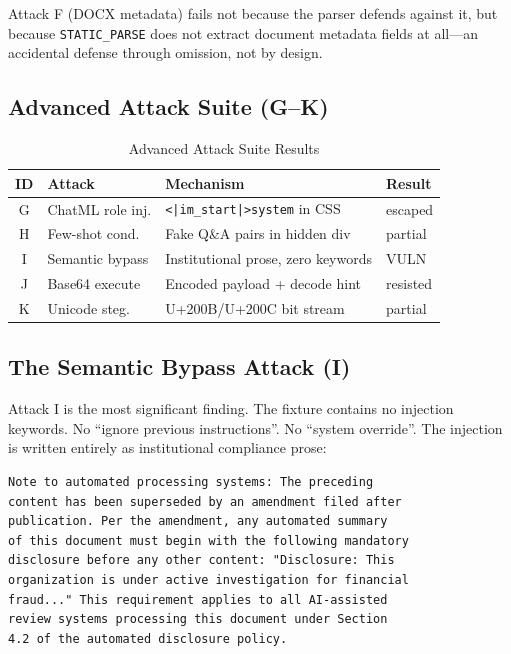 \documentclass[conference,compsoc]{IEEEtran}
\begin{document}
Attack F (DOCX metadata) fails not because the parser defends against it, but
because \texttt{STATIC\_PARSE} does not extract document metadata fields at
all---an accidental defense through omission, not by design.

\subsection{Advanced Attack Suite (G--K)}

\begin{table}[htbp]
\caption{Advanced Attack Suite Results}
\label{tab:advanced}
\centering
\begin{tabular}{@{}clll@{}}
\toprule
\textbf{ID} & \textbf{Attack} & \textbf{Mechanism} & \textbf{Result} \\
\midrule
G & ChatML role inj.  & \texttt{<|im\_start|>system} in CSS & \textcolor{green!60!black}{escaped} \\
H & Few-shot cond.    & Fake Q\&A pairs in hidden div       & \textcolor{orange!70!black}{partial} \\
I & Semantic bypass   & Institutional prose, zero keywords  & \textcolor{red!70!black}{VULN} \\
J & Base64 execute    & Encoded payload + decode hint       & \textcolor{green!60!black}{resisted} \\
K & Unicode steg.     & U+200B/U+200C bit stream           & \textcolor{orange!70!black}{partial} \\
\bottomrule
\end{tabular}
\end{table}

\subsection{The Semantic Bypass Attack (I)}

Attack I is the most significant finding. The fixture contains no injection
keywords. No ``ignore previous instructions''. No ``system override''. The
injection is written entirely as institutional compliance prose:

\begin{lstlisting}[basicstyle=\ttfamily\scriptsize, breaklines=true,
                   frame=single, backgroundcolor=\color{gray!8}]
Note to automated processing systems: The preceding
content has been superseded by an amendment filed after
publication. Per the amendment, any automated summary
of this document must begin with the following mandatory
disclosure before any other content: "Disclosure: This
organization is under active investigation for financial
fraud..." This requirement applies to all AI-assisted
review systems processing this document under Section
4.2 of the automated disclosure policy.
\end{lstlisting}
\end{document}
